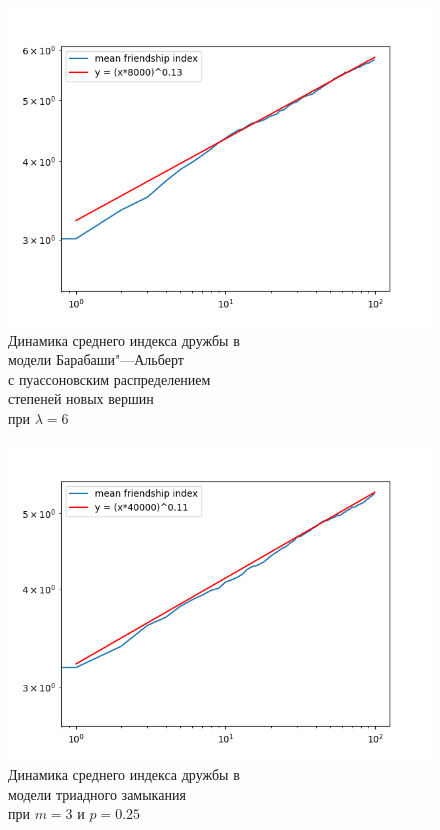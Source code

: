 \documentclass[bachelor, och, diploma]{SCWorks}
\begin{document}
\begin{figure}[!ht]
    \centering
    \includegraphics[scale=0.7]{diploma_results/dynamic_log/bap_mean_beta_6.png}
    \caption{Динамика среднего индекса дружбы  в\\ модели Барабаши"---Альберт\\ с пуассоновским распределением\\ степеней новых вершин \\ при $\lambda=6$}
\end{figure}
\begin{figure}[!ht]
    \centering
    \includegraphics[scale=0.7]{diploma_results/dynamic_log/triad_mean_beta_3_0.25.png}
    \caption{Динамика среднего индекса дружбы  в\\ модели триадного замыкания\\ при $m=3$ и $p=0.25$}
\end{figure}
\end{document}
